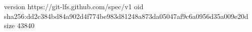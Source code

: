 version https://git-lfs.github.com/spec/v1
oid sha256:dd2c384bd84a902d4f774be983d81248a873da05047af9c6a0956d35a009e20d
size 43840
